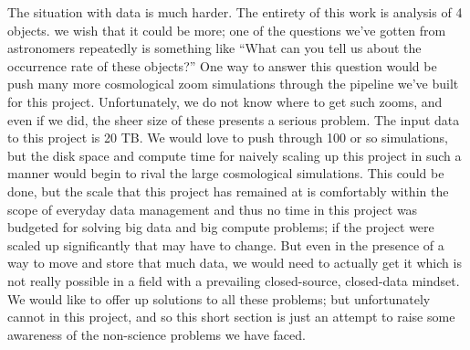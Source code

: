 The situation with data is much harder.
The entirety of this work is analysis of 4 objects.
we wish that it could be more; one of the questions we've gotten from astronomers repeatedly is something like ``What can you tell us about the occurrence rate of these objects?''
One way to answer this question would be push many more cosmological zoom simulations through the pipeline we've built for this project.
Unfortunately,   we do not know where to get such zooms, and even if we did, the sheer size of these presents a serious problem.
The input data to this project is 20 TB.
We would love to push through 100 or so simulations, but the disk space and compute time for naively scaling up this project in such a manner would begin to rival the large cosmological simulations.
This could be done, but the scale that this project has remained at is comfortably within the scope of everyday data management and thus no time in this project was budgeted for solving big data and big compute problems; if the project were scaled up significantly that may have to change.
But even in the presence of a way to move and store that much data, we would need to actually get it which is not really possible in a field with a prevailing closed-source, closed-data mindset.
We would like to offer up solutions to all these problems; but unfortunately cannot in this project, and so this short section is just an attempt to raise some awareness of the non-science problems we have faced.
